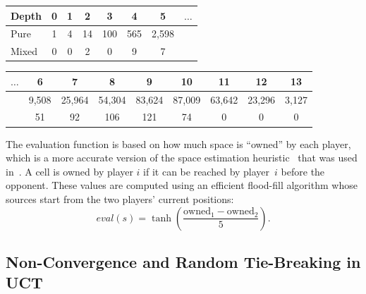 \vspace{0.1cm}

\begin{center}
\small
\begin{flushleft}
\begin{tabular}{|l|c|c|c|c|c|c|c|}
\hline Depth & 0 & 1 & 2 & 3 & 4 & 5 & $\ldots$\\
\hline Pure  & 1 & 4 & 14 & 100 & 565 & 2,598 & \\
\hline Mixed & 0 & 0 & 2 & 0 & 9 & 7 & \\
\hline
\end{tabular}
\end{flushleft}
\begin{flushright}
\begin{tabular}{|c|c|c|c|c|c|c|c|c|}
\hline  $\ldots$ & 6 & 7 & 8 & 9 & 10 & 11 & 12 & 13\\
\hline  & 9,508 & 25,964 & 54,304 & 83,624 & 87,009 & 63,642 & 23,296 & 3,127\\
\hline  & 51 & 92 & 106 & 121 & 74 & 0 & 0 & 0 \\
\hline
\end{tabular}
\end{flushright}
\end{center}

\vspace{0.1cm}

The evaluation function is based on how much space is ``owned'' by each player, which is a more accurate version of the space estimation
heuristic~\cite{DenTeuling12Tron} that was used in~\cite{Lanctot13Tron}. A cell is owned by player $i$ if it can be reached
by player~$i$ before the opponent. These values are computed using an efficient flood-fill algorithm whose sources start from the two players'
current positions:
\[
eval(s) = \tanh\left(\frac{\textrm{owned}_1 - \textrm{owned}_2}{5}\right).
\]


\subsection{Non-Convergence and Random Tie-Breaking in UCT}\label{sec:exp:brps}

